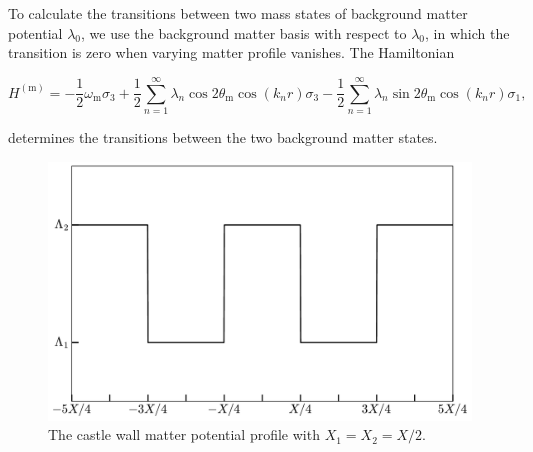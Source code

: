 \documentclass[%
reprint,
 amsmath,amssymb,
 prd,
]{revtex4-1}
\begin{document}
To calculate the transitions between two mass states of background matter potential $\lambda_0$, we use the background matter basis with respect to $\lambda_0$, in which the transition is zero when varying matter profile vanishes. The Hamiltonian
\begin{widetext}
\begin{equation}
H^{(\mathrm m)} = - \frac{1}{2}\omega_{\mathrm m} \sigma_3  + \frac{1}{2} \sum_{n=1}^{\infty} \lambda_n \cos 2\theta_{\mathrm m} \cos\left( k_n  r \right)  \sigma_3 - \frac{1}{2} \sum_{n=1}^{\infty} \lambda_n \sin 2\theta_{\mathrm m}  \cos\left( k_n r \right) \sigma_1,
\label{castle-wall-decomposed-hamiltonian}
\end{equation}
\end{widetext}
determines the transitions between the two background matter states.


\begin{figure}
    \centering
    \includegraphics[width=\columnwidth]{assets/castlewall-profile}
    \caption{The castle wall matter potential profile with $X_1=X_2=X/2$.}
    \label{fig-castlewall-profile-illustration}
\end{figure}
\end{document}
